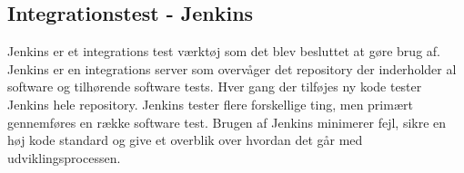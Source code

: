 \subsection*{Integrationstest - Jenkins}
Jenkins er et integrations test værktøj som det blev besluttet at gøre brug af. Jenkins er en integrations server som overvåger det repository der inderholder al software og tilhørende software tests. Hver gang der tilføjes ny kode tester Jenkins hele repository. Jenkins tester flere forskellige ting, men primært gennemføres en række software test. Brugen af Jenkins minimerer fejl, sikre en høj kode standard og give et overblik over hvordan det går med udviklingsprocessen.  
